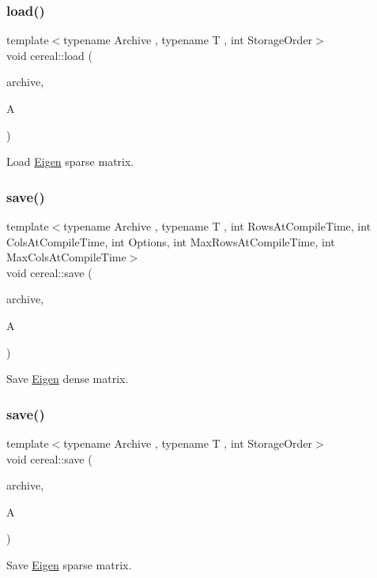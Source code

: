 \subsubsection{\texorpdfstring{load()}{load()}\hspace{0.1cm}{\footnotesize\ttfamily [2/2]}}
{\footnotesize\ttfamily template$<$typename Archive , typename T , int Storage\+Order$>$ \\
void cereal\+::load (\begin{DoxyParamCaption}\item[{Archive \&}]{archive,  }\item[{Eigen\+::\+Sparse\+Matrix$<$ T, Storage\+Order $>$ \&}]{A }\end{DoxyParamCaption})}



Load \hyperlink{namespaceEigen}{Eigen} sparse matrix. 

\mbox{\label{namespacecereal_afd0f4831f36c8d183e4ff80c96b6b9ed}} 
\subsubsection{\texorpdfstring{save()}{save()}\hspace{0.1cm}{\footnotesize\ttfamily [1/2]}}
{\footnotesize\ttfamily template$<$typename Archive , typename T , int Rows\+At\+Compile\+Time, int Cols\+At\+Compile\+Time, int Options, int Max\+Rows\+At\+Compile\+Time, int Max\+Cols\+At\+Compile\+Time$>$ \\
void cereal\+::save (\begin{DoxyParamCaption}\item[{Archive \&}]{archive,  }\item[{const Eigen\+::\+Matrix$<$ T, Rows\+At\+Compile\+Time, Cols\+At\+Compile\+Time, Options, Max\+Rows\+At\+Compile\+Time, Max\+Cols\+At\+Compile\+Time $>$ \&}]{A }\end{DoxyParamCaption})}



Save \hyperlink{namespaceEigen}{Eigen} dense matrix. 

\mbox{\label{namespacecereal_ad34bb4c1089438eff2040f675acc4855}} 
\subsubsection{\texorpdfstring{save()}{save()}\hspace{0.1cm}{\footnotesize\ttfamily [2/2]}}
{\footnotesize\ttfamily template$<$typename Archive , typename T , int Storage\+Order$>$ \\
void cereal\+::save (\begin{DoxyParamCaption}\item[{Archive \&}]{archive,  }\item[{const Eigen\+::\+Sparse\+Matrix$<$ T, Storage\+Order $>$ \&}]{A }\end{DoxyParamCaption})}



Save \hyperlink{namespaceEigen}{Eigen} sparse matrix. 

